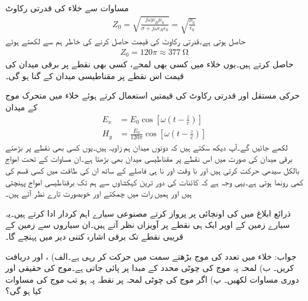 مساوات  سے خلاء کی قدرتی رکاوٹ
\begin{align*}
Z_0 =\sqrt{\frac{j \omega \mu_R \mu_0}{\sigma +j \omega \epsilon_R \epsilon_0}}=\sqrt{\frac{\mu_0}{\epsilon_0}}
\end{align*}
حاصل ہوتی ہے۔قدرتی رکاوٹ کی قیمت حاصل کرنے کی خاطر ہم  سے  لکھتے ہوئے
\begin{align}
Z_0=120 \pi \approx \SI{377}{\ohm}
\end{align}
حاصل کرتے ہیں۔یوں خلاء میں کسی بھی لمحے، کسی بھی نقطے پر برقی میدان کی قیمت اس نقطے پر مقناطیسی میدان کے  گنا ہو گی۔

حرکی مستقل اور قدرتی رکاوٹ کی قیمتیں استعمال کرتے ہوئے خلاء میں متحرک موج کے میدان
\begin{align*}
E_x&=E_0 \cos \left[\omega \left( t -\frac{z}{c} \right)\right]\\
H_y&=\frac{E_0}{120 \pi} \cos \left[ \omega \left( t -\frac{z}{c} \right) \right]
\end{align*}
لکھے جائیں گے۔آپ دیکھ سکتے ہیں کہ دونوں میدان ہم زاویہ ہیں۔یوں کسی بھی نقطے پر بڑھتے برقی میدان کی صورت میں اس نقطے پر مقناطیسی میدان بھی بڑھتا ہے۔ان مساوات کے تحت امواج بالکل سیدھی حرکت کرتی ہیں اور نا وقت اور نا ہی فاصلے کے ساتھ ان کی طاقت میں کسی قسم کی کمی رونما ہوتی ہے۔یہی وجہ ہے کہ کائنات کی دور ترین کہکشاوں سے ہم تک برقناطیسی امواج پہنچتی ہیں اور ہمیں رات میں چمکتے اور خوبصورت تارے نظر آتے ہیں۔


 ذرائع ابلاغ میں  کی اونچائی پر پرواز کرتے مصنوعی سیارے اہم کردار ادا کرتے ہیں۔یہ سیارے زمین کے اوپر ایک ہی نقطے پر آویزاں نظر آتے ہیں۔ان سیاروں سے زمین کے قریبی نقطے تک برقی اشارہ کتنی دیر میں پہنچے گا۔

جواب:
خلاء میں  تعدد کی موج بڑھتے  سمت میں حرکت کر رہی ہے۔الف) ،  اور  دریافت کریں۔ ب) لمحہ  پہ موج کی  چوٹی  محدد کے مبدا پر پائی جاتی ہے۔موج کی حقیقی اور دوری مساوات لکھیں۔ پ) اگر موج کی چوٹی لمحہ  پر نقطہ  پہ ہو تب موج کی مساوات کیا ہو گی؟ 

